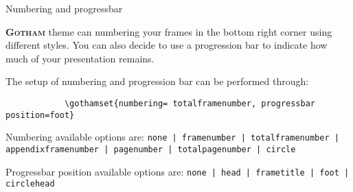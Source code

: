 \documentclass[aspectratio=169]{beamer}
\newcommand{\themename}{\textbf{\textsc{Gotham}}}
\begin{document}
	\author[]{Romain NOËL}
	{%
	\begin{frame}[fragile]{Numbering and progressbar}

		\themename{} theme can numbering your frames in the bottom right corner using different styles. 
		You can also decide to use a progression bar to indicate how much of your presentation remains.

		The setup of numbering and progression bar can be performed through:
		\begin{verbatim}
			\gothamset{numbering= totalframenumber, progressbar position=foot}
		\end{verbatim}

		Numbering available options are: \verb$none | framenumber | totalframenumber | appendixframenumber | pagenumber | totalpagenumber | circle$

		Progressbar position available options are: \verb$none | head | frametitle | foot | circlehead$
	\end{frame}
	}
\end{document}
